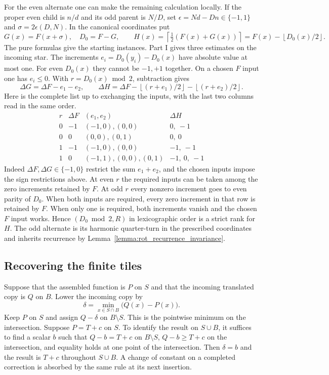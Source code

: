For the even alternate one can make the remaining calculation locally. If the proper even child is $n/d$ and its odd parent is $N/D$, set $\epsilon=Nd-Dn\in\{-1,1\}$ and $\sigma=2\epsilon(D,N)$. In the canonical coordinates put
\[
   G(x)=F(x+\sigma),\quad D_0=F-G,\qquad
   H(x)=\left\lceil\tfrac12(F(x)+G(x))\right\rceil
       =F(x)-\left\lfloor D_0(x)/2\right\rfloor .
\]
The pure formulas give the starting instances. Part I gives three estimates on the incoming star. The increments $e_i=D_0(y_i)-D_0(x)$ have absolute value at most one. For even $D_0(x)$ they cannot be $-1,+1$ together. On a chosen $F$ input one has $e_i\le0$. With $r=D_0(x)\bmod 2$, subtraction gives
\[
 \Delta G=\Delta F-e_1-e_2,\qquad
 \Delta H=\Delta F-\left\lfloor(r+e_1)/2\right\rfloor
                   -\left\lfloor(r+e_2)/2\right\rfloor .
\]
Here is the complete list up to exchanging the inputs, with the last two columns read in the same order.
\[
\begin{array}{c|c|c|c}
r&\Delta F&(e_1,e_2)&\Delta H\\ \hline
0&-1&(-1,0),(0,0)&0,\ -1\\
0&0 &(0,0),(0,1)&0,\ 0\\
1&-1&(-1,0),(0,0)&-1,\ -1\\
1&0 &(-1,1),(0,0),(0,1)&-1,\ 0,\ -1
\end{array}
\]
Indeed $\Delta F,\Delta G\in\{-1,0\}$ restrict the sum $e_1+e_2$, and the chosen inputs impose the sign restrictions above. At even $r$ the required inputs can be taken among the zero increments retained by $F$. At odd $r$ every nonzero increment goes to even parity of $D_0$. When both inputs are required, every zero increment in that row is retained by $F$. When only one is required, both increments vanish and the chosen $F$ input works. Hence $(D_0\bmod2,R)$ in lexicographic order is a strict rank for $H$. The odd alternate is its harmonic quarter-turn in the prescribed coordinates and inherits recurrence by Lemma~\ref{lemma:rot_recurrence_invariance}.

\subsection*{Recovering the finite tiles}\label{subsec:ordered_identification}
Suppose that the assembled function is $P$ on $S$ and that the incoming translated copy is $Q$ on $B$. Lower the incoming copy by
\[
       \delta=\min_{x\in S\cap B}\bigl(Q(x)-P(x)\bigr).
\]
Keep $P$ on $S$ and assign $Q-\delta$ on $B\setminus S$. This is the pointwise minimum on the intersection. Suppose $P=T+c$ on $S$. To identify the result on $S\cup B$, it suffices to find a scalar $b$ such that $Q-b=T+c$ on $B\setminus S$, $Q-b\ge T+c$ on the intersection, and equality holds at one point of the intersection. Then $\delta=b$ and the result is $T+c$ throughout $S\cup B$. A change of constant on a completed correction is absorbed by the same rule at its next insertion.

